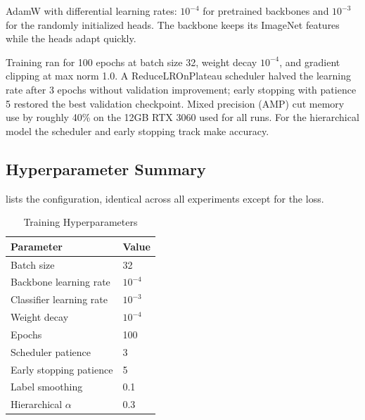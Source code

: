 AdamW with differential learning rates: $10^{-4}$ for pretrained backbones and $10^{-3}$ for the randomly initialized heads. The backbone keeps its ImageNet features while the heads adapt quickly.

Training ran for 100 epochs at batch size 32, weight decay $10^{-4}$, and gradient clipping at max norm 1.0. A ReduceLROnPlateau scheduler halved the learning rate after 3 epochs without validation improvement; early stopping with patience 5 restored the best validation checkpoint. Mixed precision (AMP) cut memory use by roughly 40\% on the 12GB RTX 3060 used for all runs. For the hierarchical model the scheduler and early stopping track make accuracy.

\subsection{Hyperparameter Summary}

 lists the configuration, identical across all experiments except for the loss.

\begin{table}[ht]
\centering
\caption{Training Hyperparameters}
\label{tab:hyperparams}
\begin{tabular}{ll}
\toprule
\textbf{Parameter} & \textbf{Value} \\
\midrule
Batch size & 32 \\
Backbone learning rate & $10^{-4}$ \\
Classifier learning rate & $10^{-3}$ \\
Weight decay & $10^{-4}$ \\
Epochs & 100 \\
Scheduler patience & 3 \\
Early stopping patience & 5 \\
Label smoothing & 0.1 \\
Hierarchical $\alpha$ & 0.3 \\
\bottomrule
\end{tabular}
\end{table}
